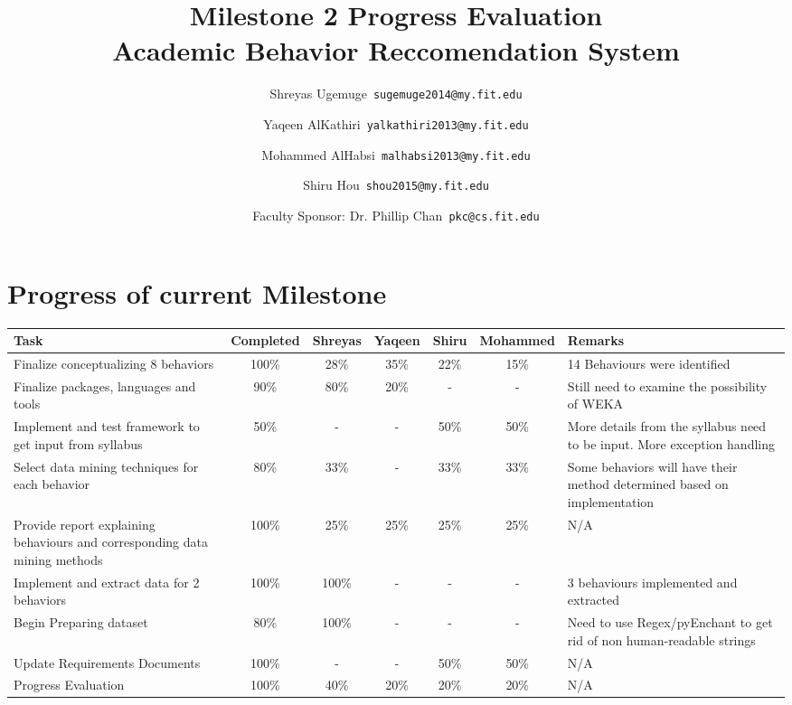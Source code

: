 \documentclass[12pt]{article}
\begin{document}
	\title{\textbf{Milestone 2 Progress Evaluation} \\ \hfill \break
	Academic Behavior Reccomendation System}
	\author{Shreyas Ugemuge\      \texttt{sugemuge2014@my.fit.edu}
  \and
  Yaqeen AlKathiri\      \texttt{yalkathiri2013@my.fit.edu}
  \and
	Mohammed AlHabsi\      \texttt{malhabsi2013@my.fit.edu}
  \and
  Shiru Hou\      \texttt{shou2015@my.fit.edu}
  \and
  Faculty Sponsor: Dr. Phillip Chan\      \texttt{pkc@cs.fit.edu}}
	\maketitle
	\pagebreak
	\singlespacing
	\tableofcontents
	\pagebreak
	\section{Progress of current Milestone}
	\begin{adjustbox}{totalheight=\baselineskip}
	\begin{tabularx}{\textwidth}{|X|c|c|c|c|c|X|}
	\hline
		\textbf{Task} & \textbf{Completed} &\textbf{Shreyas} & \textbf{Yaqeen} & \textbf{Shiru} & \textbf{Mohammed} & \textbf{Remarks}  \\
		\hline
		Finalize conceptualizing 8 behaviors & 100\% & 28\% & 35\% & 22\% & 15\% & 14 Behaviours were identified \\ \hline
		Finalize packages, languages and tools & 90\% & 80\% & 20\% & - & - & Still need to examine the possibility of WEKA \\ \hline
		Implement and test framework to get input from syllabus & 50\% & - & - & 50\% & 50\% & More details from the syllabus need to be input. More exception handling\\ \hline
		Select data mining techniques for each behavior & 80\% & 33\% & - & 33\% & 33\% & Some behaviors will have their method determined based on implementation\\ \hline
		Provide report explaining behaviours and corresponding data mining methods & 100\% &25\% & 25\% & 25\% & 25\% & N/A\\ \hline
		Implement and extract data for 2 behaviors & 100\% &100\% & - & - & - & 3 behaviours implemented and extracted\\ \hline
		Begin Preparing dataset & 80\% & 100\% & - & - & - & Need to use Regex/pyEnchant to get rid of non human-readable strings \\  \hline
		Update Requirements Documents & 100\% & - & - & 50\% & 50\% & N/A \\ \hline
		Progress Evaluation & 100\% & 40\% & 20\% & 20\% & 20\% & N/A \\ \hline 
	\end{tabularx}
	\end{adjustbox}
\end{document}
